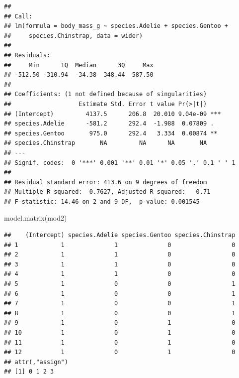 \documentclass[
]{book}
\newenvironment{Shaded}{\begin{snugshade}}{\end{snugshade}}
\newcommand{\FunctionTok}[1]{\textcolor[rgb]{0.00,0.00,0.00}{#1}}
\newcommand{\NormalTok}[1]{#1}
\newcommand{\SpecialCharTok}[1]{\textcolor[rgb]{0.00,0.00,0.00}{#1}}
\begin{document}
\begin{verbatim}
## 
## Call:
## lm(formula = body_mass_g ~ species.Adelie + species.Gentoo + 
##     species.Chinstrap, data = wider)
## 
## Residuals:
##     Min      1Q  Median      3Q     Max 
## -512.50 -310.94  -34.38  348.44  587.50 
## 
## Coefficients: (1 not defined because of singularities)
##                   Estimate Std. Error t value Pr(>|t|)    
## (Intercept)         4137.5      206.8  20.010 9.04e-09 ***
## species.Adelie      -581.2      292.4  -1.988  0.07809 .  
## species.Gentoo       975.0      292.4   3.334  0.00874 ** 
## species.Chinstrap       NA         NA      NA       NA    
## ---
## Signif. codes:  0 '***' 0.001 '**' 0.01 '*' 0.05 '.' 0.1 ' ' 1
## 
## Residual standard error: 413.6 on 9 degrees of freedom
## Multiple R-squared:  0.7627, Adjusted R-squared:   0.71 
## F-statistic: 14.46 on 2 and 9 DF,  p-value: 0.001545
\end{verbatim}

\begin{Shaded}
\begin{Highlighting}[]
\FunctionTok{model.matrix}\NormalTok{(mod2)}
\end{Highlighting}
\end{Shaded}

\begin{verbatim}
##    (Intercept) species.Adelie species.Gentoo species.Chinstrap
## 1            1              1              0                 0
## 2            1              1              0                 0
## 3            1              1              0                 0
## 4            1              1              0                 0
## 5            1              0              0                 1
## 6            1              0              0                 1
## 7            1              0              0                 1
## 8            1              0              0                 1
## 9            1              0              1                 0
## 10           1              0              1                 0
## 11           1              0              1                 0
## 12           1              0              1                 0
## attr(,"assign")
## [1] 0 1 2 3
\end{verbatim}

\begin{Shaded}
\end{Shaded}
\end{document}
